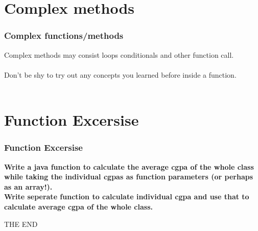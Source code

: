 \documentclass{beamer}
\begin{document}

\section{Complex methods}

\begin{frame}
\frametitle{Complex functions/methods}
Complex methods may consist loops conditionals and other function call.\\~\\
Don't be shy to try out any concepts you learned before inside a function.\\~\\

\end{frame}


\section{Function Excersise}

\begin{frame}
\frametitle{Function Excersise}
\textbf{Write a java function to calculate the average cgpa of the whole class while taking the individual cgpas as function parameters (or perhaps as an array!). \\ Write seperate function to calculate individual cgpa and use that to calculate average cgpa of the whole class.}
\end{frame}




\begin{frame}
\Huge{\centerline{THE END }}
\end{frame}

\end{document}
